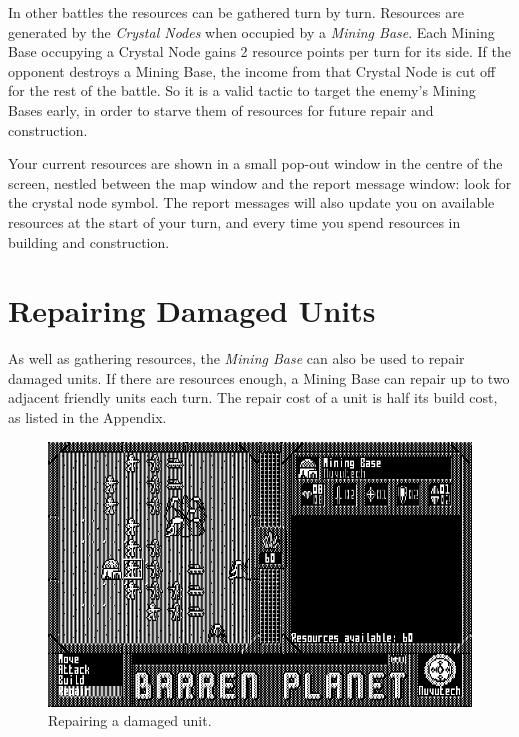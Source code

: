 In other battles the resources can be gathered turn by turn. Resources are generated by the {\it Crystal Nodes} when occupied by a {\it Mining Base}. Each Mining Base occupying a Crystal Node gains 2 resource points per turn for its side. If the opponent destroys a Mining Base, the income from that Crystal Node is cut off for the rest of the battle. So it is a valid tactic to target the enemy's Mining Bases early, in order to starve them of resources for future repair and construction.

Your current resources are shown in a small pop-out window in the centre of the screen, nestled between the map window and the report message window: look for the crystal node symbol. The report messages will also update you on available resources at the start of your turn, and every time you spend resources in building and construction.

\section{Repairing Damaged Units}

\noindent
As well as gathering resources, the {\it Mining Base} can also be used to repair damaged units. If there are resources enough, a Mining Base can repair up to two adjacent friendly units each turn. The repair cost of a unit is half its build cost, as listed in the Appendix.

\begin{figure}[h]
  \includegraphics[width=\textwidth]{unit-repair}
  \caption{Repairing a damaged unit.}
\end{figure}

